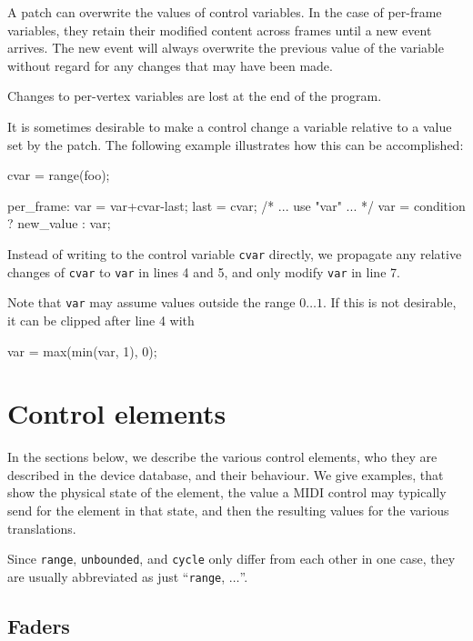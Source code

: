 \documentclass[11pt,a4paper]{article}
\begin{document}
A patch can overwrite the values of control variables. In the case of
per-frame variables, they retain their modified content across
frames until a new event arrives. The new event will always overwrite
the previous value of the variable without regard for any changes that
may have been made.

Changes to per-vertex variables are lost at the end of the program.

It is sometimes desirable to make a control change a variable relative
to a value set by the patch. The following example illustrates how
this can be accomplished:

\begin{listing}{1}
cvar = range(foo);

per_frame:
	var = var+cvar-last;
	last = cvar;
	/* ... use "var" ... */
	var = condition ? new_value : var;
\end{listing}

Instead of writing to the control variable {\tt cvar} directly, we
propagate any relative changes of {\tt cvar} to {\tt var} in lines
4 and 5, and only modify {\tt var} in line 7.

Note that {\tt var} may assume values outside the range $0\ldots 1$.
If this is not desirable, it can be clipped after line 4 with

\begin{listing}{1}
	var = max(min(var, 1), 0);
\end{listing}




\section{Control elements}

In the sections below, we describe the various control elements, who
they are described in the device database, and their behaviour. We
give examples, that show the physical state of the element, the value
a MIDI control may typically send for the element in that state, and
then the resulting values for the various translations.

Since {\tt range}, {\tt unbounded}, and {\tt cycle} only differ from
each other in one case, they are usually abbreviated as just
``{\tt range}, $\ldots$''.




\subsection{Faders}
\end{document}
